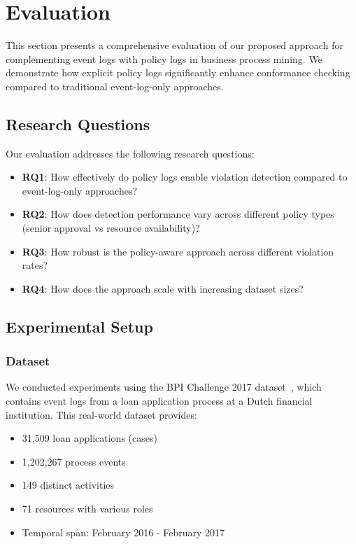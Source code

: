\section{Evaluation}\label{sec:evaluation}

This section presents a comprehensive evaluation of our proposed approach for complementing event logs with policy logs in business process mining. We demonstrate how explicit policy logs significantly enhance conformance checking compared to traditional event-log-only approaches.

\subsection{Research Questions}

Our evaluation addresses the following research questions:

\begin{itemize}
    \item \textbf{RQ1}: How effectively do policy logs enable violation detection compared to event-log-only approaches?
    \item \textbf{RQ2}: How does detection performance vary across different policy types (senior approval vs resource availability)?
    \item \textbf{RQ3}: How robust is the policy-aware approach across different violation rates?
    \item \textbf{RQ4}: How does the approach scale with increasing dataset sizes?
\end{itemize}

\subsection{Experimental Setup}

\subsubsection{Dataset}

We conducted experiments using the BPI Challenge 2017 dataset~\cite{vanDongen2017}, which contains event logs from a loan application process at a Dutch financial institution. This real-world dataset provides:

\begin{itemize}
    \item 31,509 loan applications (cases)
    \item 1,202,267 process events
    \item 149 distinct activities
    \item 71 resources with various roles
    \item Temporal span: February 2016 - February 2017
\end{itemize}

